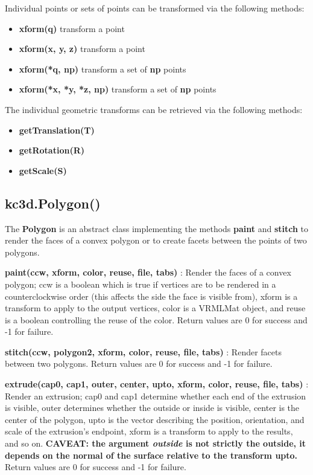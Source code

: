 \documentclass[a4paper, dvipdfm]{article}
\begin{document}
Individual points or sets of points can be transformed via the following methods:

\begin{itemize}
\item \textbf{xform(q)} transform a point\\
\item \textbf{xform(x, y, z)} transform a point\\
\item \textbf{xform(*q, np)} transform a set of \textbf{np} points\\
\item \textbf{xform(*x, *y, *z, np)} transform a set of \textbf{np} points\\
\end{itemize}

The individual geometric transforms can be retrieved via the following methods:

\begin{itemize}
\item \textbf{getTranslation(T)}\\
\item \textbf{getRotation(R)}\\
\item \textbf{getScale(S)}\\
\end{itemize}

\subsection{kc3d.Polygon()}
The \textbf{Polygon} is an abstract class implementing the methods \textbf{paint}
and \textbf{stitch} to render the faces of a convex polygon or to create facets
between the points of two polygons.

\textbf{paint(ccw, xform, color, reuse, file, tabs)} : Render the faces of a convex polygon;
ccw is a boolean which is true if vertices are to be rendered in a counterclockwise order (this
affects the side the face is visible from), xform is a transform to apply to the output vertices,
color is a VRMLMat object, and reuse is a boolean controlling the reuse of the color.
Return values are 0 for success and -1 for failure.

\textbf{stitch(ccw, polygon2, xform, color, reuse, file, tabs)} : Render facets between two
polygons. Return values are 0 for success and -1 for failure.

\textbf{extrude(cap0, cap1, outer, center, upto, xform, color, reuse, file, tabs)} : 
Render an extrusion; cap0 and cap1 determine whether each end of the extrusion is
visible, outer determines whether the outside or inside is visible, center is the
center of the polygon, upto is the vector describing the position, orientation,
and scale of the extrusion's endpoint, xform is a transform to apply to the results,
and so on. \textbf{CAVEAT: the argument \emph{outside} is not strictly the outside,
it depends on the normal of the surface relative to the transform upto.}
Return values are 0 for success and -1 for failure.
\end{document}
